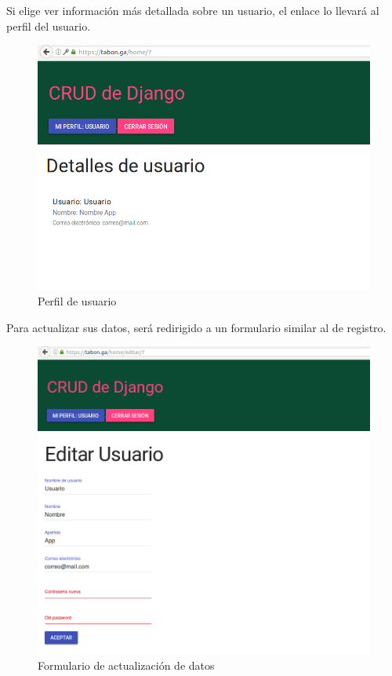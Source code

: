 \documentclass[9pt]{article}
\begin{document}
Si elige ver información más detallada sobre un usuario, el enlace lo llevará al perfil del usuario. \\
\begin{figure}[H]
  \centering
  \includegraphics[width=\textwidth]{crud/app4}
  \caption{Perfil de usuario}
\end{figure}

Para actualizar sus datos, será redirigido a un formulario similar al de registro.\\
\begin{figure}[H]
  \centering
  \includegraphics[width=\textwidth]{crud/app6}
  \caption{Formulario de actualización de datos}
\end{figure}
\end{document}
